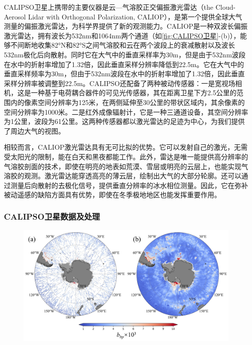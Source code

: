 CALIPSO卫星上携带的主要仪器是云—气溶胶正交偏振激光雷达（the Cloud-Aerosol Lidar with Orthogonal Polarization, CALIOP），是第一个提供全球大气测量的偏振激光雷达，为科学界提供了新的观测能力。CALIOP是一种双波长偏振激光雷达，拥有波长为532nm和1064nm两个通道（如\autoref{fig:CALIPSO卫星}-(b)），能够不间断地收集82°N和82°S之间气溶胶和云在两个波段上的衰减散射以及波长532nm极化后向散射。\cite{CALIPSO_2009}同时它在大气中的垂直采样率为30m，但是由于532nm波段在水中的折射率增加了1.32倍，因此垂直采样分辨率降低到22.5m。它在大气中的垂直采样频率为30m，但由于532nm波段在水中的折射率增加了1.32倍，因此垂直采样分辨率被调整到22.5m。CALIPSO还配备了两种被动传感器：一是宽视场相机，这是一种基于电荷耦合器件的可见光传感器，其在距离卫星下方2.5公里的范围内的像素空间分辨率为125米，在两侧延伸至30公里的带状区域内，其余像素的空间分辨率为1000米。二是红外成像辐射计，它是一种三通道设备，其空间分辨率为1公里，波段为61公里。这两种传感器都以激光雷达的足迹为中心，为我们提供了周边大气的视图。

相较而言，CALIOP激光雷达具有无可比拟的优势。它可以发射自己的激光，无需受太阳光的限制，能在白天和黑夜都能工作。此外，雷达是唯一能提供高分辨率的气溶胶剖面的技术，即使在明亮的地表如荒漠、雪层或明亮的云层上，也能实现气溶胶的观测。激光雷达能穿透高亮的薄云层，绘制出大气的大部分轮廓。还可以通过测量后向散射的去极化信号，提供垂直分辨率的冰水相位测量\cite{CALIPSO_2009,winker2003accounting}。因此，它在弥补被动遥感的缺陷方面具有优势，即使在冬季极地地区也能发挥重要作用。

\subsubsection{CALIPSO卫星数据及处理}
\begin{figure}[htbp]
    \centering
    \includegraphics[width=\linewidth]{figure/第二章用图/图2-bbp处理.jpg}
\end{figure}

